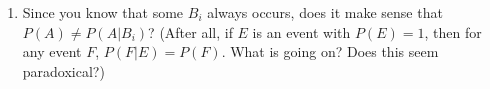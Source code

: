 \documentclass[11pt]{article}
\begin{document}
\begin{enumerate}
\begin{enumerate}
\item Since you know that some $B_i$ always occurs, does it make sense that
$P(A) \neq P(A | B_i)$?  (After all, if $E$ is an event with $P(E) = 1$,
then for any event $F$, $P(F|E) = P(F)$.  What is going on?  Does this
seem paradoxical?)
\end{enumerate}

\end{enumerate}
\end{document}
